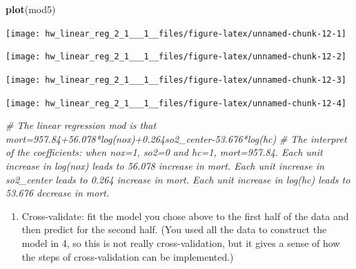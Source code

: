 \documentclass[]{article}
\newenvironment{Shaded}{\begin{snugshade}}{\end{snugshade}}
\newcommand{\KeywordTok}[1]{\textcolor[rgb]{0.13,0.29,0.53}{\textbf{#1}}}
\newcommand{\DataTypeTok}[1]{\textcolor[rgb]{0.13,0.29,0.53}{#1}}
\newcommand{\DecValTok}[1]{\textcolor[rgb]{0.00,0.00,0.81}{#1}}
\newcommand{\StringTok}[1]{\textcolor[rgb]{0.31,0.60,0.02}{#1}}
\newcommand{\CommentTok}[1]{\textcolor[rgb]{0.56,0.35,0.01}{\textit{#1}}}
\newcommand{\OperatorTok}[1]{\textcolor[rgb]{0.81,0.36,0.00}{\textbf{#1}}}
\newcommand{\NormalTok}[1]{#1}
\providecommand{\tightlist}{%
  \setlength{\itemsep}{0pt}\setlength{\parskip}{0pt}}
\begin{document}
\begin{Shaded}
\begin{Highlighting}[]
\KeywordTok{plot}\NormalTok{(mod5)}
\end{Highlighting}
\end{Shaded}

\begin{center}\texttt{[image: hw\_linear\_reg\_2\_1\_\_\_1\_\_files/figure-latex/unnamed-chunk-12-1]} \end{center}

\begin{center}\texttt{[image: hw\_linear\_reg\_2\_1\_\_\_1\_\_files/figure-latex/unnamed-chunk-12-2]} \end{center}

\begin{center}\texttt{[image: hw\_linear\_reg\_2\_1\_\_\_1\_\_files/figure-latex/unnamed-chunk-12-3]} \end{center}

\begin{center}\texttt{[image: hw\_linear\_reg\_2\_1\_\_\_1\_\_files/figure-latex/unnamed-chunk-12-4]} \end{center}

\begin{Shaded}
\begin{Highlighting}[]
\CommentTok{# The linear regression mod is that mort=957.84+56.078*log(nox)+0.264so2_center-53.676*log(hc)}
\CommentTok{# The interpret of the coefficients: when nox=1, so2=0 and hc=1, mort=957.84. Each unit increase in log(nox) leads to 56.078 increase in mort. Each unit increase in so2_center leads to 0.264 increase in mort. Each unit increase in log(hc) leads to 53.676 decrease in mort.}
\end{Highlighting}
\end{Shaded}

\begin{enumerate}
\def\labelenumi{\arabic{enumi}.}
\setcounter{enumi}{5}
\tightlist
\item
  Cross-validate: fit the model you chose above to the first half of the
  data and then predict for the second half. (You used all the data to
  construct the model in 4, so this is not really cross-validation, but
  it gives a sense of how the steps of cross-validation can be
  implemented.)
\end{enumerate}

\begin{Shaded}
\end{Shaded}
\end{document}
